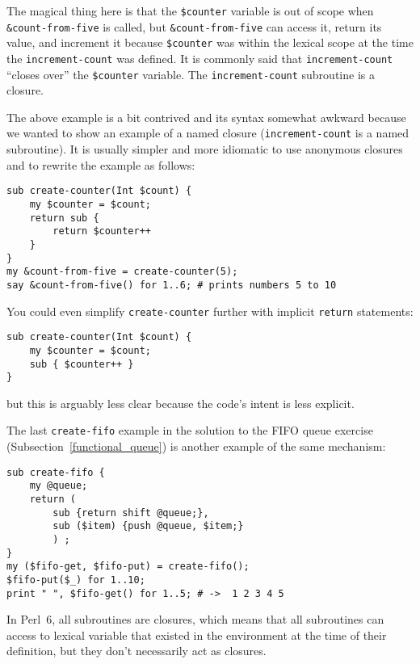 The magical thing here is that the \verb'$counter' variable 
is out of scope when \verb'&count-from-five' is called, 
but \verb'&count-from-five' can access it, return its value, 
and increment it because \verb'$counter' was within the 
lexical scope at the time the {\tt increment-count} was 
defined. It is commonly said that {\tt increment-count} 
``closes over'' the \verb'$counter' variable. 
The {\tt increment-count} subroutine is a closure.

The above example is a bit contrived and its syntax 
somewhat awkward because we wanted to show an example 
of a named closure ({\tt increment-count} is a named 
subroutine). It is usually simpler and more idiomatic 
to use anonymous closures and to rewrite the example 
as follows:

\begin{verbatim}
sub create-counter(Int $count) {
    my $counter = $count;
    return sub {
        return $counter++
    }
}
my &count-from-five = create-counter(5);
say &count-from-five() for 1..6; # prints numbers 5 to 10
\end{verbatim}

You could even simplify {\tt create-counter} further 
with implicit {\tt return} statements:

\begin{verbatim}
sub create-counter(Int $count) {
    my $counter = $count;
    sub { $counter++ }
}
\end{verbatim}

but this is arguably less clear because the code's intent 
is less explicit.

The last {\tt create-fifo} example in the solution to 
the FIFO queue exercise (Subsection~\ref{functional_queue}) 
is another example of the same mechanism:

\begin{verbatim}
sub create-fifo {
    my @queue;
    return (
        sub {return shift @queue;}, 
        sub ($item) {push @queue, $item;}
        ) ;
}
my ($fifo-get, $fifo-put) = create-fifo();
$fifo-put($_) for 1..10;
print " ", $fifo-get() for 1..5; # ->  1 2 3 4 5
\end{verbatim}
%

In Perl~6, all subroutines are closures, which means that 
all subroutines can access to lexical variable that 
existed in the environment at the time of their definition, 
but they don't necessarily act as closures.

